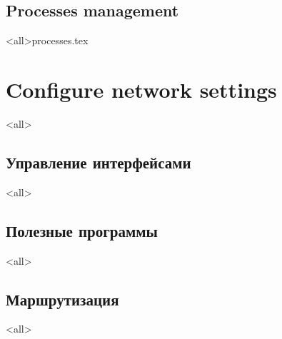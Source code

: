 \subsection{Processes management}
\mode<all>{{processes.tex}}


\section{Configure network settings}
\mode<all>{} %

\subsection{Управление интерфейсами}
\mode<all>{}

\subsection{Полезные программы}
\mode<all>{}

\subsection{Маршрутизация}
\mode<all>{}



